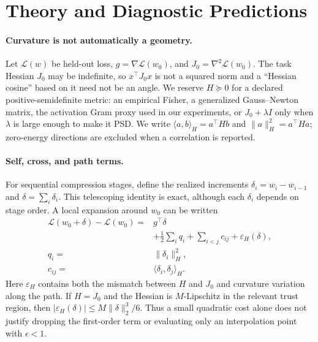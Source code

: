 \section{Theory and Diagnostic Predictions}
\label{sec:theory}

\paragraph{Curvature is not automatically a geometry.}
Let $\mathcal{L}(w)$ be held-out loss, $g=\nabla\mathcal{L}(w_0)$, and
$J_0=\nabla^2\mathcal{L}(w_0)$.  The task Hessian $J_0$ may be
indefinite, so $x^\top J_0x$ is not a squared norm and a ``Hessian
cosine'' based on it need not be an angle.  We reserve $H\succeq0$ for
a declared positive-semidefinite metric: an empirical Fisher, a
generalized Gauss--Newton matrix, the activation Gram proxy used in our
experiments, or $J_0+\lambda I$ only when $\lambda$ is large enough to
make it PSD.  We write
$\langle a,b\rangle_H=a^\top Hb$ and
$\|a\|_H^2=a^\top Ha$; zero-energy directions are excluded when a
correlation is reported.

\paragraph{Self, cross, and path terms.}
For sequential compression stages, define the realized increments
$\delta_i=w_i-w_{i-1}$ and $\delta=\sum_i\delta_i$.  This telescoping
identity is exact, although each $\delta_i$ depends on stage order.  A
local expansion around $w_0$ can be written
\begin{equation}
\label{eq:loss-decomposition}
\begin{split}
\mathcal{L}(w_0+\delta)-\mathcal{L}(w_0)
={}&g^\top\delta\\
&+\frac{1}{2}\sum_i q_i+\sum_{i<j}c_{ij}
+\varepsilon_H(\delta),\\
q_i={}&\|\delta_i\|_H^2,\\
c_{ij}={}&\langle\delta_i,\delta_j\rangle_H .
\end{split}
\end{equation}
Here $\varepsilon_H$ contains both the mismatch between $H$ and $J_0$
and curvature variation along the path.  If $H=J_0$ and the Hessian is
$M$-Lipschitz in the relevant trust region, then
$|\varepsilon_H(\delta)|\le M\|\delta\|_2^3/6$.
Thus a small quadratic cost alone does not justify dropping the
first-order term or evaluating only an interpolation point with
$\epsilon<1$.

